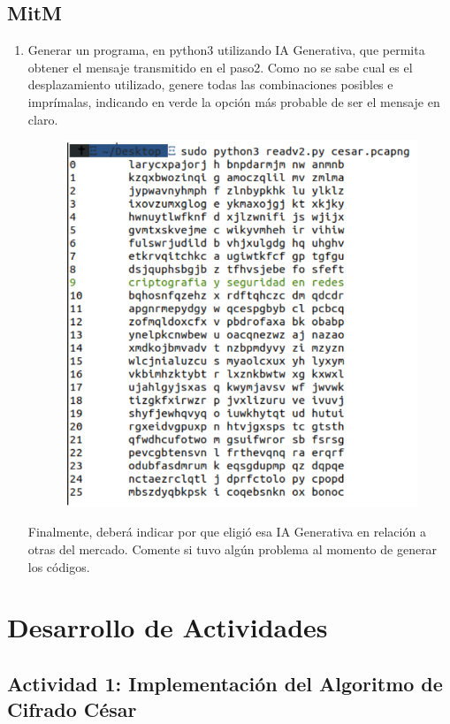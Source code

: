 \documentclass[letter,12pt]{article}
\begin{document}
\subsection{MitM}
\begin{enumerate}
    \item Generar un programa, en python3 utilizando IA Generativa, que permita obtener el mensaje transmitido en el paso2. Como no se sabe cual es el desplazamiento utilizado, genere todas las combinaciones posibles e imprímalas, indicando en verde la opción más probable de ser el mensaje en claro.
    
    \begin{figure}[H]
        \centering
        \includegraphics[width=12cm]{actividades/A3.png}
        \label{fig:a3}
    \end{figure}
    
    Finalmente, deberá indicar por que eligió esa IA Generativa en relación a otras del mercado. Comente si tuvo algún problema al momento de generar los códigos.

\end{enumerate}

\section{Desarrollo de Actividades}

\subsection{Actividad 1: Implementación del Algoritmo de Cifrado César}
\end{document}
